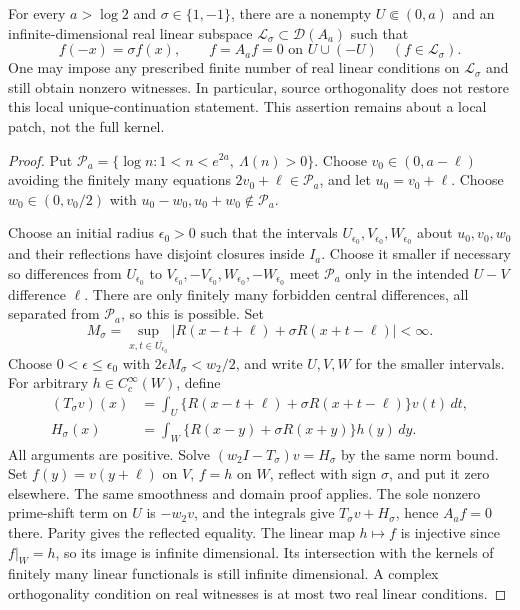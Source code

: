 \begin{proposition}
\label{prop:ns55-parity-ucp-counterexample}
For every $a>\log2$ and $\sigma\in\{1,-1\}$, there are a nonempty
$U\Subset(0,a)$ and an infinite-dimensional real linear subspace
$\mathcal L_\sigma\subset\mathcal D(A_a)$ such that
\[
 f(-x)=\sigma f(x),\qquad f=A_af=0\text{ on }U\cup(-U)
 \quad(f\in\mathcal L_\sigma).
\]
One may impose any prescribed finite number of real linear conditions
on $\mathcal L_\sigma$ and still obtain nonzero witnesses. In particular,
source orthogonality does not restore this local unique-continuation
statement. This assertion remains about a local patch, not the full kernel.
\end{proposition}
\begin{proof}
Put $\mathcal P_a=\{\log n:1<n<e^{2a},\ \Lambda(n)>0\}$.
Choose $v_0\in(0,a-\ell)$ avoiding the finitely many equations
$2v_0+\ell\in\mathcal P_a$, and let $u_0=v_0+\ell$.
Choose $w_0\in(0,v_0/2)$ with
$u_0-w_0,u_0+w_0\notin\mathcal P_a$.

Choose an initial radius $\epsilon_0>0$ such that the intervals
$U_{\epsilon_0},V_{\epsilon_0},W_{\epsilon_0}$ about $u_0,v_0,w_0$
and their reflections have disjoint closures inside $I_a$.
Choose it smaller if necessary so differences from $U_{\epsilon_0}$
to $V_{\epsilon_0},-V_{\epsilon_0},W_{\epsilon_0},-W_{\epsilon_0}$
meet $\mathcal P_a$ only in the intended $U-V$ difference $\ell$.
There are only finitely many forbidden central differences, all
separated from $\mathcal P_a$, so this is possible. Set
\[
 M_\sigma=\sup_{x,t\in\overline{U_{\epsilon_0}}}
  |R(x-t+\ell)+\sigma R(x+t-\ell)|<\infty .
\]
Choose $0<\epsilon\le\epsilon_0$ with
$2\epsilon M_\sigma<w_2/2$, and write $U,V,W$ for the smaller intervals.
For arbitrary $h\in C_c^\infty(W)$, define
\begin{align*}
 (T_\sigma v)(x)&=\int_U
       \{R(x-t+\ell)+\sigma R(x+t-\ell)\}v(t)\,dt,\\
 H_\sigma(x)&=\int_W
       \{R(x-y)+\sigma R(x+y)\}h(y)\,dy .
\end{align*}
All arguments are positive. Solve
$(w_2I-T_\sigma)v=H_\sigma$ by the same norm bound.
Set $f(y)=v(y+\ell)$ on $V$, $f=h$ on $W$, reflect with sign $\sigma$,
and put it zero elsewhere. The same smoothness and domain proof applies.
The sole nonzero prime-shift term on $U$ is $-w_2v$, and the integrals
give $T_\sigma v+H_\sigma$, hence $A_af=0$ there. Parity gives the
reflected equality. The linear map $h\mapsto f$ is injective since
$f|_W=h$, so its image is infinite dimensional. Its intersection with
the kernels of finitely many linear functionals is still infinite
dimensional. A complex orthogonality condition on real witnesses is
at most two real linear conditions.
\end{proof}

